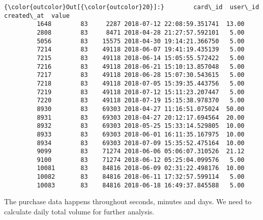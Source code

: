 \documentclass[11pt]{article}
\begin{document}
\begin{Verbatim}[commandchars=\\\{\}]
{\color{outcolor}Out[{\color{outcolor}20}]:}        card\_id  user\_id                 created\_at  value
         1648        83     2287 2018-07-12 22:08:59.351741  13.00
         2808        83     8471 2018-04-28 21:27:57.592101   5.00
         5056        83    15575 2018-04-30 19:14:21.366750   5.00
         7214        83    49118 2018-06-07 19:41:19.435139   5.00
         7215        83    49118 2018-06-14 15:05:55.572422   5.00
         7216        83    49118 2018-06-21 15:10:13.857048   5.00
         7217        83    49118 2018-06-28 15:07:30.543615   5.00
         7218        83    49118 2018-07-05 15:39:35.443756   5.00
         7219        83    49118 2018-07-12 15:11:23.207447   5.00
         7220        83    49118 2018-07-19 15:15:38.978370   5.00
         8930        83    69303 2018-04-27 11:16:51.075024  50.00
         8931        83    69303 2018-04-27 20:12:17.694564  20.00
         8932        83    69303 2018-05-25 15:33:14.529805  10.00
         8933        83    69303 2018-06-01 16:11:35.167975  10.00
         8934        83    69303 2018-07-09 15:35:52.475164  10.00
         9099        83    71274 2018-06-06 05:06:07.310526  21.12
         9100        83    71274 2018-06-12 05:25:04.099576   5.00
         10081       83    84816 2018-06-09 02:31:22.498176  10.00
         10082       83    84816 2018-06-11 17:32:57.599114   5.00
         10083       83    84816 2018-06-18 16:49:37.845588   5.00
\end{Verbatim}
            
    The purchase data happens throughout seconds, minutes and days. We need
to calculate daily total volume for further analysis.
\end{document}
